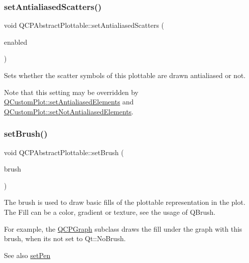 \subsubsection{\texorpdfstring{set\+Antialiased\+Scatters()}{setAntialiasedScatters()}}
{\footnotesize\ttfamily void Q\+C\+P\+Abstract\+Plottable\+::set\+Antialiased\+Scatters (\begin{DoxyParamCaption}\item[{bool}]{enabled }\end{DoxyParamCaption})}

Sets whether the scatter symbols of this plottable are drawn antialiased or not.

Note that this setting may be overridden by \hyperlink{class_q_custom_plot_af6f91e5eab1be85f67c556e98c3745e8}{Q\+Custom\+Plot\+::set\+Antialiased\+Elements} and \hyperlink{class_q_custom_plot_ae10d685b5eabea2999fb8775ca173c24}{Q\+Custom\+Plot\+::set\+Not\+Antialiased\+Elements}. \hypertarget{class_q_c_p_abstract_plottable_a7a4b92144dca6453a1f0f210e27edc74}{}\label{class_q_c_p_abstract_plottable_a7a4b92144dca6453a1f0f210e27edc74} 
\subsubsection{\texorpdfstring{set\+Brush()}{setBrush()}}
{\footnotesize\ttfamily void Q\+C\+P\+Abstract\+Plottable\+::set\+Brush (\begin{DoxyParamCaption}\item[{const Q\+Brush \&}]{brush }\end{DoxyParamCaption})}

The brush is used to draw basic fills of the plottable representation in the plot. The Fill can be a color, gradient or texture, see the usage of Q\+Brush.

For example, the \hyperlink{class_q_c_p_graph}{Q\+C\+P\+Graph} subclass draws the fill under the graph with this brush, when it\textquotesingle{}s not set to Qt\+::\+No\+Brush.

\begin{DoxySeeAlso}{See also}
\hyperlink{class_q_c_p_abstract_plottable_ab74b09ae4c0e7e13142fe4b5bf46cac7}{set\+Pen} 
\end{DoxySeeAlso}
\hypertarget{class_q_c_p_abstract_plottable_a8524fa2994c63c0913ebd9bb2ffa3920}{}\label{class_q_c_p_abstract_plottable_a8524fa2994c63c0913ebd9bb2ffa3920} 
